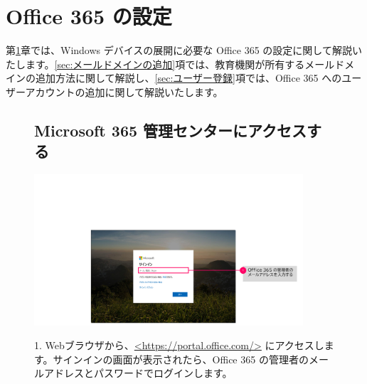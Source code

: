 
\onecolumn
\chapter{Office 365 の設定}
\label{chap:O365設定1}


第\ref{chap:O365設定1}章では、Windows デバイスの展開に必要な Office 365 の設定に関して解説いたします。\ref{sec:メールドメインの追加}項では、教育機関が所有するメールドメインの追加方法に関して解説し、\ref{sec:ユーザー登録}項では、Office 365 へのユーザーアカウントの追加に関して解説いたします。 
　　
\begin{figure}[htbp]
    \section{Microsoft 365 管理センターにアクセスする}
    \label{sec:M365管理センター}
\end{figure}

\begin{figure}[h]
    \begin{minipage}{0.6\textwidth}
        \vspace{-2cm}
        \includegraphics[width=10cm]{figures/M365_setting1-00.png}
    \end{minipage}
    \begin{minipage}{0.4\textwidth}
        1. Webブラウザから、\url{<https://portal.office.com/>} にアクセスします。サインインの画面が表示されたら、Office 365 の管理者のメールアドレスとパスワードでログインします。
    \end{minipage}

\end{figure}

